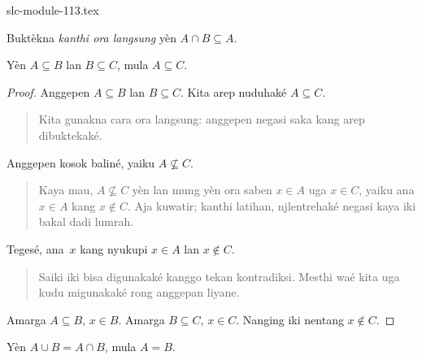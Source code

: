 \begin{filecontents*}[overwrite]{slc-module-113.tex}
\begin{prob}
Buktèkna \emph{kanthi ora langsung} yèn
$A \cap B \subseteq A$.
\end{prob}

\begin{prop}
Yèn $A \subseteq B$ lan $B \subseteq C$,
mula $A \subseteq C$.
\end{prop}

\begin{proof}
  Anggepen $A \subseteq B$ lan $B \subseteq C$.
  Kita arep nuduhaké $A
  \subseteq C$.
  \begin{quote}
    Kita gunakna cara ora langsung: anggepen
    negasi saka kang arep dibuktekaké.
  \end{quote}
  Anggepen kosok baliné, yaiku
  $A \nsubseteq C$.
  \begin{quote}
    Kaya mau, $A \nsubseteq C$ yèn lan mung
    yèn ora saben $x \in A$ uga $x \in C$,
    yaiku ana $x \in A$ kang $x \notin C$.
    Aja kuwatir; kanthi latihan, njlentrehaké
    negasi kaya iki bakal dadi lumrah.
  \end{quote}
  Tegesé, ana~$x$ kang nyukupi $x \in A$
  lan $x \notin C$.
  \begin{quote}
    Saiki iki bisa digunakaké kanggo tekan
    kontradiksi. Mesthi waé kita uga kudu
    migunakaké rong anggepan liyane.
  \end{quote}
  Amarga $A \subseteq B$, $x \in B$.
  Amarga $B \subseteq C$, $x \in
  C$. Nanging iki nentang $x \notin C$.
\end{proof}

\begin{prop}
Yèn $A \cup B = A \cap B$, mula $A = B$.
\end{prop}


\end{filecontents*}
